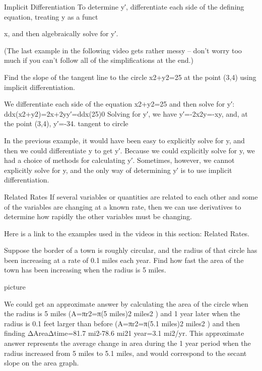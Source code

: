 Implicit Differentiation
To determine y′, differentiate each side of the defining equation, treating y as a funct\begin{example} x, and then algebraically solve for y′.

(The last example in the following video gets rather messy – don't worry too much if you can't follow all of the simplifications at the end.)

\begin{example}
Find the slope of the tangent line to the circle x2+y2=25 at the point (3,4) using implicit differentiation.

\begin{solution} We differentiate each side of the equation x2+y2=25 and then solve for y′:
ddx(x2+y2)=2x+2yy′=ddx(25)0
Solving for y′, we have y′=-2x2y=-xy, and, at the point (3,4),
y′=-34.
tangent to circle
\end{solution}\end{example}

In the previous example, it would have been easy to explicitly solve for y, and then we could differentiate y to get y′. Because we could explicitly solve for y, we had a choice of methods for calculating y′. Sometimes, however, we cannot explicitly solve for y, and the only way of determining y′ is to use implicit differentiation.

Related Rates
If several variables or quantities are related to each other and some of the variables are changing at a known rate, then we can use derivatives to determine how rapidly the other variables must be changing.

Here is a link to the examples used in the videos in this section: Related Rates.

\begin{example}
Suppose the border of a town is roughly circular, and the radius of that circle has been increasing at a rate of 0.1 miles each year. Find how fast the area of the town has been increasing when the radius is 5 miles.

picture
\begin{solution} We could get an approximate answer by calculating the area of the circle when the radius is 5 miles (A=πr2=π(5 miles)2 miles2 ) and 1 year later when the radius is 0.1 feet larger than before (A=πr2=π(5.1 miles)2 miles2 ) and then finding
ΔAreaΔtime=81.7 mi2-78.6 mi21 year=3.1 mi2/yr.
This approximate answer represents the average change in area during the 1 year period when the radius increased from 5 miles to 5.1 miles, and would correspond to the secant slope on the area graph.


\end{solution}
\end{example}
\end{example}
